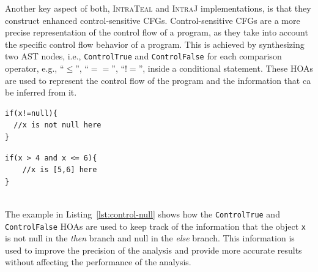 Another key aspect of both, \textsc{IntraTeal} and \textsc{IntraJ} implementations, is that they
construct enhanced control-sensitive CFGs. Control-sensitive CFGs
are a more precise representation of the control flow of a program, as they take
into account the specific control flow behavior of a program. This is achieved by
synthesizing two AST nodes, i.e., \texttt{ControlTrue} and \texttt{ControlFalse} for each
comparison operator, e.g.,  ``$\le$'', ``$==$'', ``$!=$'', inside a conditional statement.
These HOAs are used to represent the control flow of the program and the information that ca be inferred from
it. \\
%
\begin{minipage}{0.45\textwidth}
    \begin{lstlisting}[language=JastAdd,caption={Control-sensitivity to improve null pointer analysis.}, label={lst:control-null}]
if(x!=null){
  //x is not null here
}
    \end{lstlisting}
    \end{minipage}\hfill%
    \begin{minipage}{0.45\textwidth}
    \begin{lstlisting}[language=JastAdd,caption={Control-sensitivity to improve interval analysis.}, label={lst:control-interval}]
if(x > 4 and x <= 6){
    //x is [5,6] here
}
    \end{lstlisting}
\end{minipage}\\
The example in Listing~\ref{lst:control-null} shows how the \texttt{ControlTrue} and \texttt{ControlFalse}
HOAs are used to keep track of the information that the object \texttt{x} is not null
in the \emph{then} branch and null in the \emph{else} branch.
This information is used to improve the precision of the analysis and provide
more accurate results without affecting the performance of the analysis.

